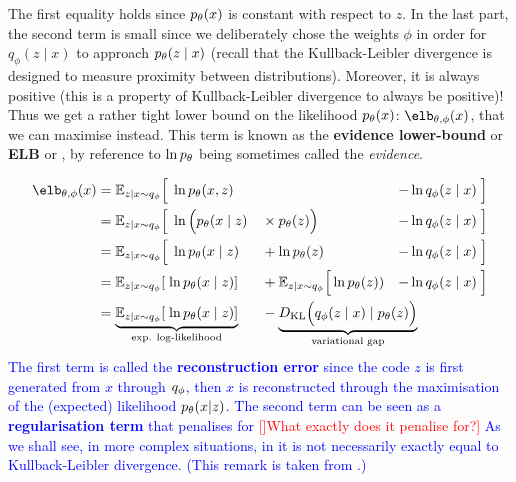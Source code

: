 \documentclass{article}
\begin{document}
\begin{appendix}
The first equality holds since $p_\theta(x)$ is constant with respect to $z$. In the last part, the second term is small since we deliberately chose the weights $\phi$ in order for $q_{\phi}(z \mid x)$ to approach $p_\theta (z \mid x)$ (recall that the Kullback-Leibler divergence is designed to measure proximity between distributions). Moreover, it is always positive (this is a property of Kullback-Leibler divergence to always be positive)! Thus we get a rather tight lower bound on the likelihood $p_\theta(x)$: $\elb_{\theta, \phi}(x)$, that we can maximise instead. This term is known as the \textbf{evidence lower-bound} or \textbf{ELB} or , by reference to $\ln p_\theta$ being sometimes called the \textit{evidence}.

\begin{comment}
\end{comment}

\textcolor{blue}{
\begin{align*}
\elb_{\theta, \phi}(x)
& = \esp_{z|x\sim q_\phi} \Big[ \; \ln \pt(x, z) && & -\ln \qp(z \mid x)  \; \Big] \\
& = \esp_{z|x\sim q_\phi} \Big[ \; \ln \Big(  \pt(x \mid z) && \times \pt (z) \Big) & -\ln \qp(z \mid x)  \; \Big] \\
& = \esp_{z|x \sim q_\phi} \Big[ \; \ln  \pt(x \mid z) && + \ln \pt (z) & -\ln \qp(z \mid x)  \; \Big] \\
& = \esp_{z|x \sim q_\phi} [ \; \ln  \pt(x \mid z) ] && + \esp_{z|x \sim q_\phi} \Big[ \ln \pt (z) ) & - \ln \qp(z \mid x)  \; \Big] \\
& = \underbrace{
    \esp_{z|x \sim q_\phi} [ \; \ln  \pt(x \mid z) ]
}_{
    \text{exp. log-likelihood}
}
&& - \mathrlap{ \underbrace{
     \KL \Big(\qp(z \mid x) \mid \pt(z) \Big)
}_{
    \text{variational gap}
} }
\end{align*}
The first term is called the \textbf{reconstruction error} since the code $z$ is first generated from $x$ through $q_\phi$, then $x$ is reconstructed through the maximisation of the (expected) likelihood $p_\theta(x|z)$. The second term can be seen as a \textbf{regularisation term} that penalises for \textcolor{red}{[]What exactly does it penalise for?]} As we shall see, in more complex situations, in it is not necessarily exactly equal to Kullback-Leibler divergence. (This remark is taken from \cite{deepgen}.)
}




\end{appendix}
\end{document}
